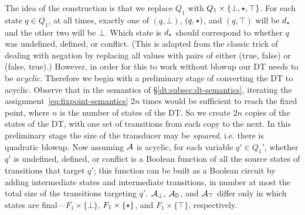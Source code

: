 The idea of the construction is that we replace $Q_1$ with $Q_1 \times \{\bot, \star,\top\}$. For each state $q \in Q_1$, at all times, exactly one of $(q, \bot)$, $(q, \star)$, and $(q, \top)$ will be $d_\star$ and the other two will be $\bot$. Which state is $d_\star$ should correspond to whether $q$ was undefined, defined, or conflict. (This is adapted from the classic trick of dealing with negation by replacing all values with pairs of either (true, false) or (false, true).) However, in order for this to work without blowup our DT needs to be \emph{acyclic}. Therefore we begin with a preliminary stage of converting the DT to acyclic. Observe that in the semantics of \S\ref{dt:subsec:dt-semantics}, iterating the assignment~\eqref{eq:fixpoint-semantics} $2n$ times would be sufficient to reach the fixed point, where $n$ is the number of states of the DT. So we create $2n$ copies of the states of the DT, with one set of transitions from each copy to the next. In this preliminary stage the size of the transducer may be \emph{squared}, i.e. there is quadratic blowup. Now assuming $\mathcal{A}$ is acyclic, for each variable $q' \in Q_1'$, whether $q'$ is undefined, defined, or conflict is a Boolean function of all the source states of transitions that target $q'$; this function can be built as a Boolean circuit by adding intermediate states and intermediate transitions, in number at most the total size of the transitions targeting $q'$.
$\mathcal{A}_\bot$, $\mathcal{A}_{\mathbb{D}}$, and $\mathcal{A}_\top$ differ only in which states are final---$F_1 \times \{\bot\}$, $F_1 \times \{\star\}$, and $F_1 \times \{\top\}$, respectively.

%

